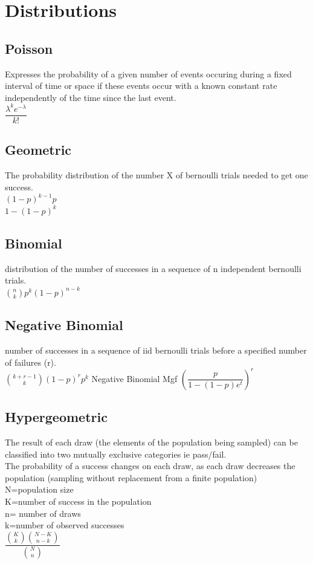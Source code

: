 \documentclass[openany]{book}
\begin{document}
\tableofcontents
\chapter{Distributions}
\section{Poisson}
Expresses the probability of a given number of events occuring during a fixed interval of time or space if these events occur with a known constant rate independently of the time since the last event.\\
$\dfrac{\lambda^k e^{-\lambda}}{k!}$\medbreak
\section{Geometric}
The probability distribution of the number X of bernoulli trials needed to get one success.\\
$(1-p)^{k-1}p$\\
$1-(1-p)^k$\medbreak
\section{Binomial}
distribution of the number of successes in a sequence of n independent bernoulli trials.\\
$\binom{n}{k} p^k(1-p)^{n-k}$ \medbreak
\section{Negative Binomial}
number of successes in a sequence of iid bernoulli trials before a specified number of failures (r).\\
$\binom{k+r-1}{k}(1-p)^r p^k$\medbreak
Negative Binomial Mgf $\left(\dfrac{p}{1-(1-p)e^t}\right)^r$
\section{Hypergeometric}
The result of each draw (the elements of the population being sampled) can be classified into two mutually exclusive categories ie pass/fail.\\
The probability of a success changes on each draw, as each draw decreases the population (sampling without replacement from a finite population)\\
N=population size\\
K=number of success in the population\\
n= number of draws\\
k=number of observed successes\\
$\dfrac{\binom{K}{k}\binom{N-K}{n-k}}{\binom{N}{n}}$
\end{document}
